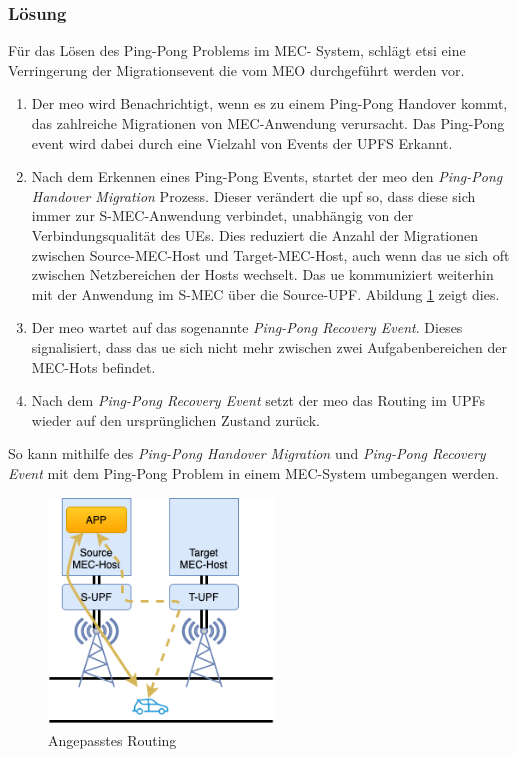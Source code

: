 \documentclass[runningheads]{llncs}
\numberwithin{figure}{section}
\begin{document}
\subsubsection{Lösung}
Für das Lösen des Ping-Pong Problems im MEC- System, schlägt \acrshort{etsi} eine Verringerung der Migrationsevent die vom MEO durchgeführt werden vor.
\begin{enumerate}
  \item Der \acrshort{meo} wird Benachrichtigt, wenn es zu einem Ping-Pong Handover kommt, das zahlreiche Migrationen von MEC-Anwendung verursacht. Das
  Ping-Pong event wird dabei durch eine Vielzahl von Events der UPFS Erkannt.
  \item Nach dem Erkennen eines Ping-Pong Events, startet der \acrshort{meo} den \textit{Ping-Pong Handover Migration} Prozess. Dieser verändert die \acrshort{upf}
  so, dass diese sich immer zur S-MEC-Anwendung verbindet, unabhängig von der Verbindungsqualität des UEs. Dies reduziert die Anzahl der Migrationen
  zwischen Source-MEC-Host und Target-MEC-Host, auch wenn das \acrshort{ue} sich oft zwischen Netzbereichen der Hosts wechselt. Das \acrshort{ue} kommuniziert weiterhin
  mit der Anwendung im S-MEC über die Source-UPF. Abildung \ref{fig:pingpongrouting} zeigt dies.
  \item Der \acrshort{meo} wartet auf das sogenannte \textit{Ping-Pong Recovery Event}. Dieses signalisiert, dass das \acrshort{ue} sich nicht mehr zwischen zwei
  Aufgabenbereichen der MEC-Hots befindet.
  \item Nach dem \textit{Ping-Pong Recovery Event} setzt der \acrshort{meo} das Routing im UPFs wieder auf den ursprünglichen Zustand zurück.
\end{enumerate}
So kann mithilfe des \textit{Ping-Pong Handover Migration} und \textit{Ping-Pong Recovery Event} mit dem Ping-Pong Problem
in einem MEC-System umbegangen werden.
\begin{figure}
  \centering
  \includegraphics[width=6cm]{images/pingpongrouting.png}
  \caption{Angepasstes Routing}
  \label{fig:pingpongrouting}
\end{figure}
\newpage
\end{document}
